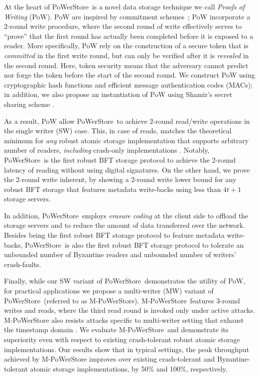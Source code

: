 \documentclass[10pt,conference,compsocconf]{IEEEtran}
\newcommand{\protocol}{PoWerStore}
\newcommand{\mprotocol}{M-PoWerStore}
\begin{document}
At the heart of \protocol\ is a novel data storage technique we call \emph{Proofs of Writing} (PoW). PoW are inspired by commitment schemes~\cite{Halevi1996};  PoW incorporate a 2-round write procedure, where the second round of write effectively serves to ``prove'' that the first round has actually been completed before it is exposed to a reader.
More specifically, PoW rely on the construction of a secure token that is \emph{committed} in the first write round, but can
only be verified after it is \emph{revealed} in the second round. Here, token security means that the adversary cannot predict nor forge the token
before the start of the second round. We construct PoW using cryptographic hash functions and efficient message authentication codes (MACs); in addition, we also propose an instantiation of PoW using
Shamir's secret sharing scheme \cite{Sha79}.

As a result, PoW allow \protocol\ to achieve 2-round read/write operations in the single writer (SW) case. This, in case of reads, matches the theoretical minimum for \emph{any} robust atomic storage implementation that supports arbitrary number of readers, \emph{including} crash-only implementations \cite{DGLV10}. Notably, \protocol\ is the first robust BFT storage protocol to achieve the 2-round latency of reading without using digital signatures.
On the other hand, we prove the 2-round write inherent, by showing a 2-round write lower bound for any robust BFT storage that features metadata write-backs using less than $4t+1$ storage servers.



In addition, \protocol\ employs \emph{erasure coding} at the client side to offload the storage servers and to reduce the amount of data transferred over the network. Besides being the first robust BFT storage protocol to feature metadata write-backs, \protocol\ is also the first robust BFT storage protocol to tolerate an unbounded number of Byzantine readers \cite{LR06} and unbounded number of writers' crash-faults.

Finally, while our SW variant of \protocol\ demonstrates the utility of PoW, for practical applications we propose a multi-writer (MW) variant of \protocol\ (referred to as \mprotocol). \mprotocol\ features 3-round writes and reads, where the third read round is invoked only under active attacks. \mprotocol{} also resists attacks specific to multi-writer setting that exhaust
the timestamp domain \cite{BD04}. We evaluate \mprotocol\ and demonstrate its superiority even with respect to existing crash-tolerant robust atomic storage implementations. Our results show that in typical settings, the peak throughput achieved by \mprotocol{} improves over existing crash-tolerant \cite{ABND95} and Byzantine-tolerant \cite{Phalanx} atomic storage implementations, by 50\% and 100\%, respectively.
\end{document}
